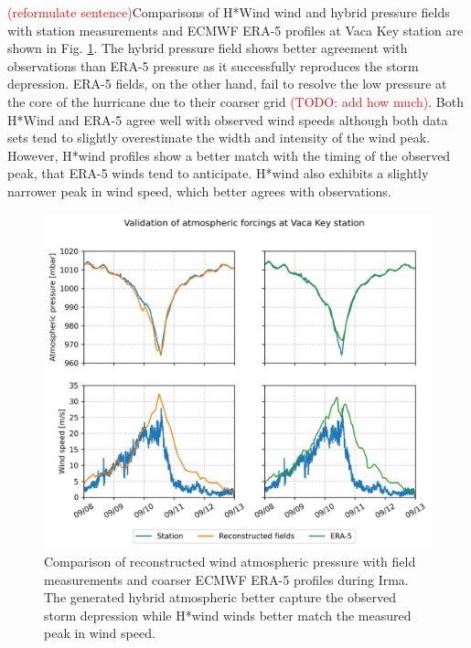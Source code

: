\documentclass[11pt,a4paper]{article}
\begin{document}
\textcolor{red}{(reformulate sentence)}Comparisons of H*Wind wind and hybrid pressure fields with station measurements and ECMWF ERA-5 profiles at Vaca Key station are shown in Fig. \ref{fig:forcings}. The hybrid pressure field shows better agreement with observations than ERA-5 pressure as it successfully reproduces the storm depression. ERA-5 fields, on the other hand, fail to resolve the low pressure at the core of the hurricane due to their coarser grid \textcolor{red}{(TODO: add how much)}. Both H*Wind and ERA-5 agree well with observed wind speeds although both data sets tend to slightly overestimate the width and intensity of the wind peak. However, H*wind profiles show a better match with the timing of the observed peak, that ERA-5 winds tend to anticipate. H*wind also exhibits a slightly narrower peak in wind speed, which better agrees with observations.

\begin{figure}
    \centering
    \includegraphics[width=.95\textwidth]{fig/validation_met_2.png}
    \caption{Comparison of reconstructed wind atmospheric pressure with field measurements and coarser ECMWF ERA-5 profiles during Irma. The generated hybrid atmospheric better capture the observed storm depression while H*wind winds better match the measured peak in wind speed.}
    \label{fig:forcings}
\end{figure}
\end{document}
